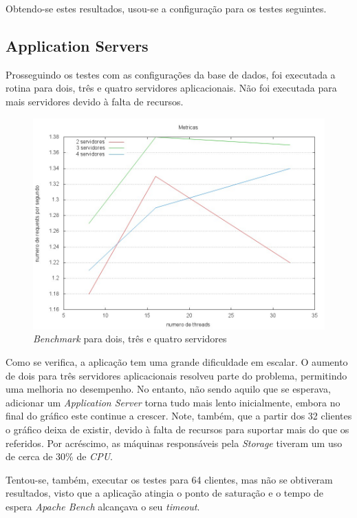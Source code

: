 Obtendo-se estes resultados, usou-se a configuração para os testes seguintes.

\subsection{Application Servers}

Prosseguindo os testes com as configurações da base de dados, foi executada a rotina para dois, três e quatro servidores aplicacionais. Não foi executada para mais servidores devido à falta de recursos.

\begin{figure}[H]
\centerline{\includegraphics[width=1\textwidth]{images/benchmark/servers}}
\caption{\emph{Benchmark} para dois, três e quatro servidores}
\end{figure}


Como se verifica, a aplicação tem uma grande dificuldade em escalar. O aumento de dois para três servidores aplicacionais resolveu parte do problema, permitindo uma melhoria no desempenho. No entanto, não sendo aquilo que se esperava, adicionar um \emph{Application Server} torna tudo mais lento inicialmente, embora no final do gráfico este continue a crescer. Note, também, que a partir dos 32 clientes o gráfico deixa de existir, devido à falta de recursos para suportar mais do que os referidos. Por acréscimo, as máquinas responsáveis pela \emph{Storage} tiveram um uso de cerca de 30\% de \emph{CPU}.

Tentou-se, também, executar os testes para 64 clientes, mas não se obtiveram resultados, visto que a aplicação atingia o ponto de saturação e o tempo de espera \emph{Apache Bench} alcançava o seu \emph{timeout}.
